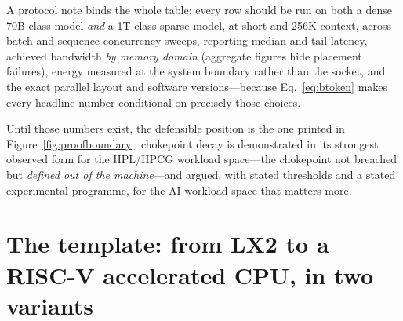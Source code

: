 A protocol note binds the whole table: every row should be run on both a dense 70B-class model \emph{and} a 1T-class sparse model, at short and 256K context, across batch and sequence-concurrency sweeps, reporting median and tail latency, achieved bandwidth \emph{by memory domain} (aggregate figures hide placement failures), energy measured at the system boundary rather than the socket, and the exact parallel layout and software versions---because Eq.~\eqref{eq:btoken} makes every headline number conditional on precisely those choices.

Until those numbers exist, the defensible position is the one printed in Figure~\ref{fig:proofboundary}: chokepoint decay is demonstrated in its strongest observed form for the HPL/HPCG workload space---the chokepoint not breached but \emph{defined out of the machine}---and argued, with stated thresholds and a stated experimental programme, for the AI workload space that matters more.

\section{The template: from LX2 to a RISC-V accelerated CPU, in two variants}
\label{sec:template}

